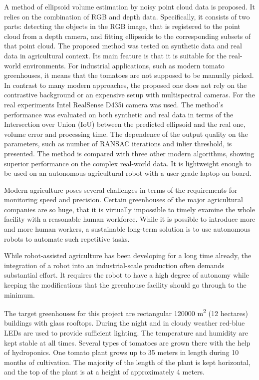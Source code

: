 A method of ellipsoid volume estimation by noisy point cloud data is proposed.
It relies on the combination of RGB and depth data.
Specifically, it consists of two parts: detecting the objects in the RGB image, that is registered to the point cloud from a depth camera, and fitting ellipsoids to the corresponding subsets of that point cloud.
The proposed method was tested on synthetic data and real data in agricultural context.
Its main feature is that it is suitable for the real-world environments.
For industrial applications, such as modern tomato greenhouses, it means that the tomatoes are not supposed to be manually picked.
In contrast to many modern approaches, the proposed one does not rely on the contrastive background or an expensive setup with multispectral cameras.
For the real experiments Intel RealSense D435i camera was used.
The method's performance was evaluated on both synthetic and real data in terms of the Intersection over Union (IoU) between the predicted ellipsoid and the real one, volume error and processing time.
The dependence of the output quality on the parameters, such as number of RANSAC iterations and inlier threshold, is presented.
The method is compared with three other modern algorithms, showing superior performance on the complex real-world data.
It is lightweight enough to be used on an autonomous agricultural robot with a user-grade laptop on board.

Modern agriculture poses several challenges in terms of the requirements for monitoring speed and precision.
Certain greenhouses of the major agricultural companies are so huge, that it is virtually impossible to timely examine the whole facility with a reasonable human workforce.
While it is possible to introduce more and more human workers, a sustainable long-term solution is to use autonomous robots to automate such repetitive tasks.

While robot-assisted agriculture has been developing for a long time already, the integration of a robot into an industrial-scale production often demands substantial effort.
It requires the robot to have a high degree of autonomy while keeping the modifications that the greenhouse facility should go through to the minimum.

The target greenhouses for this project are rectangular 120000 \si{m^2} (12 hectares) buildings with glass rooftops.
During the night and in cloudy weather red-blue LEDs are used to provide sufficient lighting.
The temperature and humidity are kept stable at all times. Several types of tomatoes are grown there with the help of hydroponics. One tomato plant grows up to 35 meters in length during 10 months of cultivation.
The majority of the length of the plant is kept horizontal, and the top of the plant is at a height of approximately 4 meters.

